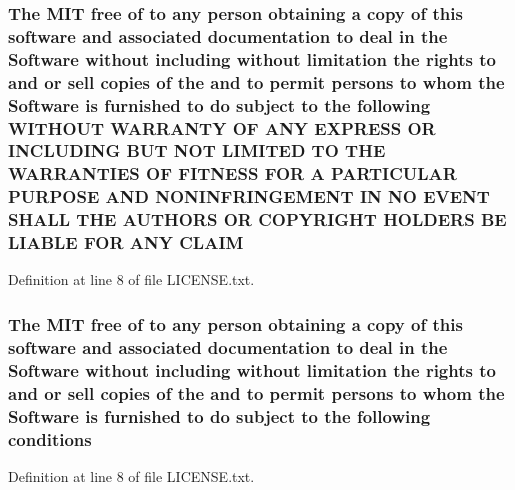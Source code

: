 \hypertarget{LICENSE_8txt_a6748037be7bf72df72169eafdc8c492e}{
\subsubsection[{C\-L\-A\-I\-M}]{\setlength{\rightskip}{0pt plus 5cm}The M\-I\-T free of to any person obtaining a {\bf copy} of this software and associated documentation to deal in the {\bf Software} without including without limitation the rights to and or sell copies of the and to permit persons to whom the {\bf Software} is furnished to do subject to the following W\-I\-T\-H\-O\-U\-T W\-A\-R\-R\-A\-N\-T\-Y O\-F A\-N\-Y E\-X\-P\-R\-E\-S\-S O\-R I\-N\-C\-L\-U\-D\-I\-N\-G B\-U\-T N\-O\-T L\-I\-M\-I\-T\-E\-D T\-O T\-H\-E W\-A\-R\-R\-A\-N\-T\-I\-E\-S O\-F F\-I\-T\-N\-E\-S\-S F\-O\-R A P\-A\-R\-T\-I\-C\-U\-L\-A\-R P\-U\-R\-P\-O\-S\-E A\-N\-D N\-O\-N\-I\-N\-F\-R\-I\-N\-G\-E\-M\-E\-N\-T I\-N N\-O E\-V\-E\-N\-T S\-H\-A\-L\-L T\-H\-E A\-U\-T\-H\-O\-R\-S O\-R C\-O\-P\-Y\-R\-I\-G\-H\-T H\-O\-L\-D\-E\-R\-S B\-E L\-I\-A\-B\-L\-E F\-O\-R A\-N\-Y C\-L\-A\-I\-M}}\label{LICENSE_8txt_a6748037be7bf72df72169eafdc8c492e}


Definition at line 8 of file L\-I\-C\-E\-N\-S\-E.\-txt.

\hypertarget{LICENSE_8txt_a9519688b6bdbbccdcec5fef05966b25b}{
\subsubsection[{conditions}]{\setlength{\rightskip}{0pt plus 5cm}The M\-I\-T free of to any person obtaining a {\bf copy} of this software and associated documentation to deal in the {\bf Software} without including without limitation the rights to and or sell copies of the and to permit persons to whom the {\bf Software} is furnished to do subject to the following conditions}}\label{LICENSE_8txt_a9519688b6bdbbccdcec5fef05966b25b}


Definition at line 8 of file L\-I\-C\-E\-N\-S\-E.\-txt.

